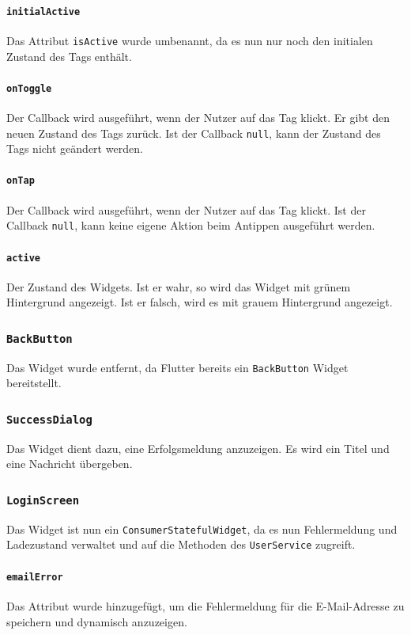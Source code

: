 \documentclass{implementierungsheft}
\begin{document}
\paragraph*{\texttt{initialActive}}
Das Attribut \texttt{isActive} wurde umbenannt, da es nun nur noch den initialen Zustand des Tags enthält.
\paragraph*{\texttt{onToggle}}
Der Callback wird ausgeführt, wenn der Nutzer auf das Tag klickt. Er gibt den neuen Zustand des Tags zurück. Ist der Callback \texttt{null}, kann der Zustand des Tags nicht geändert werden.
\paragraph*{\texttt{onTap}}
Der Callback wird ausgeführt, wenn der Nutzer auf das Tag klickt. Ist der Callback \texttt{null}, kann keine eigene Aktion beim Antippen ausgeführt werden.
\paragraph*{\texttt{active}}
Der Zustand des Widgets. Ist er wahr, so wird das Widget mit grünem Hintergrund angezeigt. Ist er falsch, wird es mit grauem Hintergrund angezeigt.
\subsubsection*{\texttt{BackButton}}
Das Widget wurde entfernt, da Flutter bereits ein \texttt{BackButton} Widget bereitstellt.
\subsubsection*{\texttt{SuccessDialog}}
Das Widget dient dazu, eine Erfolgsmeldung anzuzeigen. Es wird ein Titel und eine Nachricht übergeben.
\subsubsection{\texttt{LoginScreen}}
Das Widget ist nun ein \texttt{ConsumerStatefulWidget}, da es nun Fehlermeldung und Ladezustand verwaltet und auf die Methoden des \texttt{UserService} zugreift.
\paragraph{\texttt{emailError}}
Das Attribut wurde hinzugefügt, um die Fehlermeldung für die E-Mail-Adresse zu speichern und dynamisch anzuzeigen.
\end{document}
